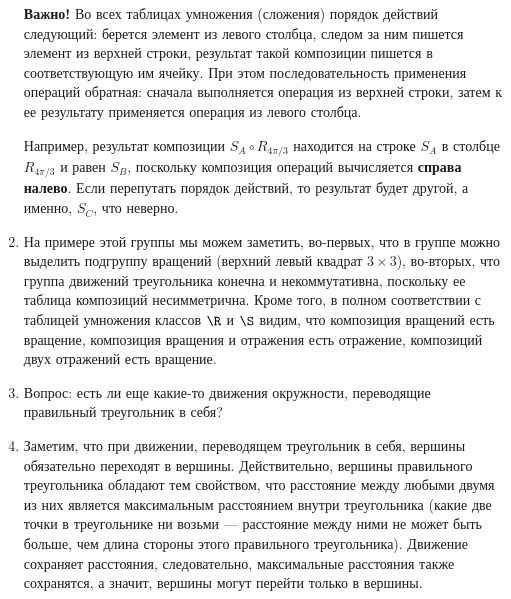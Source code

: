 \begin{enumerate}
\textbf{Важно!} Во всех таблицах умножения (сложения) порядок действий следующий: берется элемент из левого столбца, следом за ним пишется элемент из верхней строки, результат такой композиции пишется в соответствующую им ячейку. При этом последовательность применения операций обратная: сначала выполняется операция из верхней строки, затем к ее результату применяется операция из левого столбца.

Например, результат композиции $S_A\circ R_{4\pi/3}$ находится на строке $S_A$ в столбце $R_{4\pi/3}$ и равен $S_B$, поскольку композиция операций вычисляется \textbf{справа налево}. Если перепутать порядок действий, то результат будет другой, а именно, $S_C$, что неверно.

\item На примере этой группы мы можем заметить, во-первых, что в группе можно выделить подгруппу вращений (верхний левый квадрат $3\times 3$), во-вторых, что группа движений треугольника конечна и некоммутативна, поскольку ее таблица композиций несимметрична. Кроме того, в полном соответствии с таблицей умножения классов $\R$ и $\S$ видим, что композиция вращений есть вращение, композиция вращения и отражения есть отражение, композиций двух отражений есть вращение.
\item Вопрос: есть ли еще какие-то движения окружности, переводящие правильный треугольник в себя?
\item Заметим, что при движении, переводящем треугольник в себя, вершины обязательно переходят в вершины.
Действительно, вершины правильного треугольника обладают тем свойством, что расстояние между любыми двумя из них является максимальным расстоянием внутри треугольника (какие две точки в треугольнике ни возьми --- расстояние между ними не может быть больше, чем длина стороны этого правильного треугольника). Движение сохраняет расстояния, следовательно, максимальные расстояния также сохранятся, а значит, вершины могут перейти только в вершины.


\end{enumerate}
